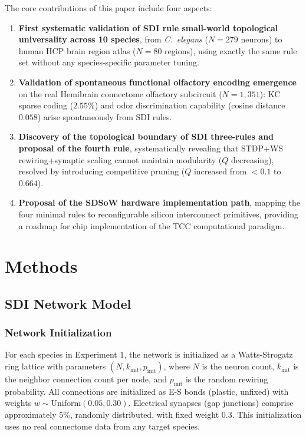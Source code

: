 \documentclass[12pt,a4paper]{article}
\begin{document}
The core contributions of this paper include four aspects:
\begin{enumerate}
\item \textbf{First systematic validation of SDI rule small-world topological universality across 10 species}, from \textit{C.\ elegans} ($N=279$ neurons) to human HCP brain region atlas ($N=80$ regions), using exactly the same rule set without any species-specific parameter tuning.
\item \textbf{Validation of spontaneous functional olfactory encoding emergence} on the real Hemibrain connectome olfactory subcircuit ($N=1{,}351$): KC sparse coding ($2.55\%$) and odor discrimination capability (cosine distance $0.058$) arise spontaneously from SDI rules.
\item \textbf{Discovery of the topological boundary of SDI three-rules and proposal of the fourth rule}, systematically revealing that STDP+WS rewiring+synaptic scaling cannot maintain modularity ($Q$ decreasing), resolved by introducing competitive pruning ($Q$ increased from $<0.1$ to $0.664$).
\item \textbf{Proposal of the SDSoW hardware implementation path}, mapping the four minimal rules to reconfigurable silicon interconnect primitives, providing a roadmap for chip implementation of the TCC computational paradigm.
\end{enumerate}

\section{Methods}

\subsection{SDI Network Model}

\subsubsection{Network Initialization}
For each species in Experiment 1, the network is initialized as a Watts-Strogatz ring lattice \citep{watts1998} with parameters $(N, k_{\text{init}}, p_{\text{init}})$, where $N$ is the neuron count, $k_{\text{init}}$ is the neighbor connection count per node, and $p_{\text{init}}$ is the random rewiring probability. All connections are initialized as E-S bonds (plastic, unfixed) with weights $w \sim \text{Uniform}(0.05, 0.30)$. Electrical synapses (gap junctions) comprise approximately 5\%, randomly distributed, with fixed weight 0.3. This initialization uses no real connectome data from any target species.
\end{document}
